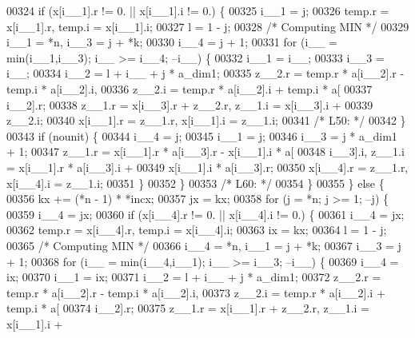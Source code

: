 \begin{DoxyCode}
00324             \textcolor{keywordflow}{if} (x[i\_\_1].r != 0. || x[i\_\_1].i != 0.) \{
00325             i\_\_1 = j;
00326             temp.r = x[i\_\_1].r, temp.i = x[i\_\_1].i;
00327             l = 1 - j;
00328 \textcolor{comment}{/* Computing MIN */}
00329             i\_\_1 = *n, i\_\_3 = j + *k;
00330             i\_\_4 = j + 1;
00331             \textcolor{keywordflow}{for} (i\_\_ = min(i\_\_1,i\_\_3); i\_\_ >= i\_\_4; --i\_\_) \{
00332                 i\_\_1 = i\_\_;
00333                 i\_\_3 = i\_\_;
00334                 i\_\_2 = l + i\_\_ + j * a\_dim1;
00335                 z\_\_2.r = temp.r * a[i\_\_2].r - temp.i * a[i\_\_2].i, 
00336                     z\_\_2.i = temp.r * a[i\_\_2].i + temp.i * a[
00337                     i\_\_2].r;
00338                 z\_\_1.r = x[i\_\_3].r + z\_\_2.r, z\_\_1.i = x[i\_\_3].i + 
00339                     z\_\_2.i;
00340                 x[i\_\_1].r = z\_\_1.r, x[i\_\_1].i = z\_\_1.i;
00341 \textcolor{comment}{/* L50: */}
00342             \}
00343             \textcolor{keywordflow}{if} (nounit) \{
00344                 i\_\_4 = j;
00345                 i\_\_1 = j;
00346                 i\_\_3 = j * a\_dim1 + 1;
00347                 z\_\_1.r = x[i\_\_1].r * a[i\_\_3].r - x[i\_\_1].i * a[
00348                     i\_\_3].i, z\_\_1.i = x[i\_\_1].r * a[i\_\_3].i + 
00349                     x[i\_\_1].i * a[i\_\_3].r;
00350                 x[i\_\_4].r = z\_\_1.r, x[i\_\_4].i = z\_\_1.i;
00351             \}
00352             \}
00353 \textcolor{comment}{/* L60: */}
00354         \}
00355         \} \textcolor{keywordflow}{else} \{
00356         kx += (*n - 1) * *incx;
00357         jx = kx;
00358         \textcolor{keywordflow}{for} (j = *n; j >= 1; --j) \{
00359             i\_\_4 = jx;
00360             \textcolor{keywordflow}{if} (x[i\_\_4].r != 0. || x[i\_\_4].i != 0.) \{
00361             i\_\_4 = jx;
00362             temp.r = x[i\_\_4].r, temp.i = x[i\_\_4].i;
00363             ix = kx;
00364             l = 1 - j;
00365 \textcolor{comment}{/* Computing MIN */}
00366             i\_\_4 = *n, i\_\_1 = j + *k;
00367             i\_\_3 = j + 1;
00368             \textcolor{keywordflow}{for} (i\_\_ = min(i\_\_4,i\_\_1); i\_\_ >= i\_\_3; --i\_\_) \{
00369                 i\_\_4 = ix;
00370                 i\_\_1 = ix;
00371                 i\_\_2 = l + i\_\_ + j * a\_dim1;
00372                 z\_\_2.r = temp.r * a[i\_\_2].r - temp.i * a[i\_\_2].i, 
00373                     z\_\_2.i = temp.r * a[i\_\_2].i + temp.i * a[
00374                     i\_\_2].r;
00375                 z\_\_1.r = x[i\_\_1].r + z\_\_2.r, z\_\_1.i = x[i\_\_1].i + 

\end{DoxyCode}
